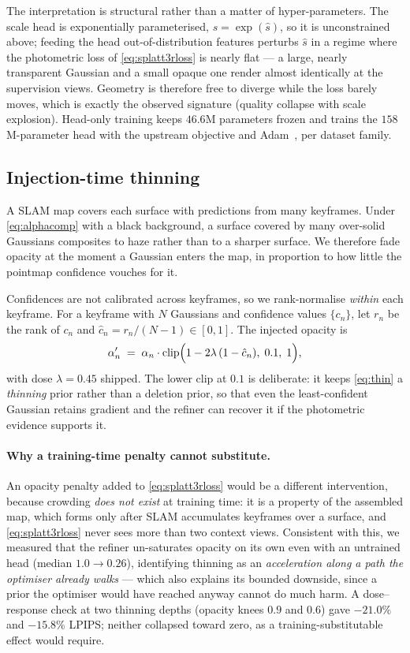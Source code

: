 The interpretation is structural rather than a matter of hyper-parameters. The
scale head is exponentially parameterised, $s = \exp(\hat{s})$, so it is
unconstrained above; feeding the head out-of-distribution features perturbs
$\hat{s}$ in a regime where the photometric loss of \cref{eq:splatt3rloss} is
nearly flat --- a large, nearly transparent Gaussian and a small opaque one
render almost identically at the supervision views. Geometry is therefore free
to diverge while the loss barely moves, which is exactly the observed
signature (quality collapse with scale explosion). Head-only training keeps
$46.6$M parameters frozen and trains the $158$M-parameter head with the
upstream objective and Adam~\cite{kingma2015adam}, per dataset family.

\subsection{Injection-time thinning}
\label{sec:method:thin}

A SLAM map covers each surface with predictions from many keyframes. Under
\cref{eq:alphacomp} with a black background, a surface covered by many
over-solid Gaussians composites to haze rather than to a sharper surface. We
therefore fade opacity at the moment a Gaussian enters the map, in proportion
to how little the pointmap confidence vouches for it.

Confidences are not calibrated across keyframes, so we rank-normalise
\emph{within} each keyframe. For a keyframe with $N$ Gaussians and confidence
values $\{c_n\}$, let $r_n$ be the rank of $c_n$ and
$\hat{c}_n = r_n/(N-1) \in [0,1]$. The injected opacity is
\begin{equation}
\alpha'_n \;=\; \alpha_n \cdot
\mathrm{clip}\Bigl(1 - 2\lambda\,(1-\hat{c}_n),\; 0.1,\; 1\Bigr),
\label{eq:thin}
\end{equation}
with dose $\lambda{=}0.45$ shipped. The lower clip at $0.1$ is deliberate: it
keeps \cref{eq:thin} a \emph{thinning} prior rather than a deletion prior, so
that even the least-confident Gaussian retains gradient and the refiner can
recover it if the photometric evidence supports it.

\paragraph{Why a training-time penalty cannot substitute.}
An opacity penalty added to \cref{eq:splatt3rloss} would be a different
intervention, because crowding \emph{does not exist} at training time: it is a
property of the assembled map, which forms only after SLAM accumulates
keyframes over a surface, and \cref{eq:splatt3rloss} never sees more than two
context views. Consistent with this, we measured that the refiner
un-saturates opacity on its own even with an untrained head (median
$1.0\rightarrow0.26$), identifying thinning as an \emph{acceleration along a
path the optimiser already walks} --- which also explains its bounded
downside, since a prior the optimiser would have reached anyway cannot do much
harm. A dose--response check at two thinning depths (opacity knees $0.9$ and
$0.6$) gave $-21.0\%$ and $-15.8\%$ LPIPS; neither collapsed toward zero, as a
training-substitutable effect would require.

